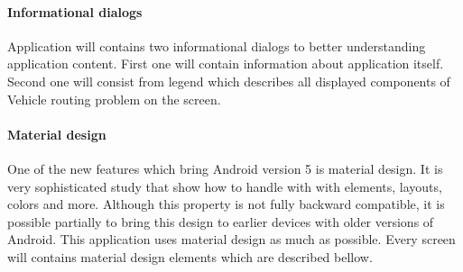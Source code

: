 \paragraph{Informational dialogs}
Application will contains two informational dialogs to better understanding application content. First one will contain
information about application itself. Second one will consist from legend which describes all displayed components of
Vehicle routing problem on the screen.

\paragraph{Material design}
One of the new features which bring Android version 5 is material design. It is very sophisticated study that show how
to handle with with elements, layouts, colors and more. Although this property is not fully backward compatible, it is
possible partially to bring this design to earlier devices with older versions of Android. This application uses
material design as much as possible. Every screen will contains material design elements which are described bellow.
